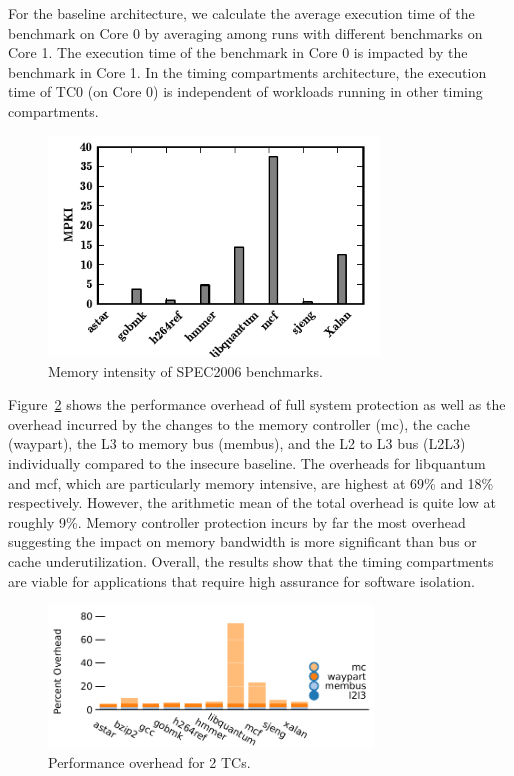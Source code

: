 For the baseline architecture, we calculate the average execution time of the 
benchmark on Core 0 by averaging among runs with different benchmarks on Core 1. 
The execution time of the benchmark in Core 0 is impacted by the benchmark in 
Core 1. In the timing compartments architecture, the execution time of TC0 (on 
Core 0) is independent of workloads running in other timing compartments.

\begin{figure}
    \begin{center}
        \includegraphics[width=3.46in]{figs/memstudy.pdf}
        \caption{Memory intensity of SPEC2006 benchmarks.}
        \label{fig:memstudy}
    \end{center}
\end{figure}

Figure~\ref{fig:performance} shows the performance overhead of full system 
protection as well as the overhead incurred by the changes to the memory 
controller (mc), the cache (waypart), the L3 to memory bus (membus), and the L2 
to L3 bus (L2L3) individually compared to the insecure baseline. The
overheads for libquantum and mcf, which are particularly memory intensive, are 
highest at 69\% and 18\% respectively. However, the arithmetic mean of the 
total overhead is quite low at roughly 9\%. Memory controller protection incurs 
by far the most overhead suggesting the impact on memory bandwidth is more 
significant than bus or cache underutilization. Overall, the results show that 
the timing compartments are viable for applications that require high assurance 
for software isolation.

\begin{figure}
    \begin{center}
        \includegraphics[width=3.4in]{figs/breakdown.pdf}
        \caption{Performance overhead for 2 TCs.}
        \label{fig:performance}
    \end{center}
\end{figure}

